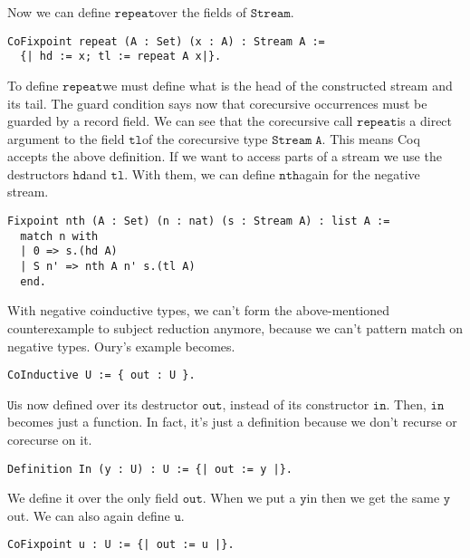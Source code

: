 \documentclass[a4paper,cleardoubleempty,BCOR1cm]{scrbook}
\begin{document}
Now we can define $\mathtt{repeat}$\;over the fields of $\mathtt{Stream}$.

\begin{verbatim}
CoFixpoint repeat (A : Set) (x : A) : Stream A :=
  {| hd := x; tl := repeat A x|}.
\end{verbatim}

To define $\mathtt{repeat}$\;we must define what is the head of the constructed stream
and its tail.  The guard condition says now that corecursive
occurrences must be guarded by a record field.  We can see that the
corecursive call $\mathtt{repeat}$\;is a direct argument to the field $\mathtt{tl}$\;of the
corecursive type $\mathtt{Stream\;A}$.  This means Coq accepts the above definition.
If we want to access parts of a stream we use the destructors $\mathtt{hd}$\;and
$\mathtt{tl}$.  With them, we can define $\mathtt{nth}$\;again for the negative stream.

\begin{verbatim}
Fixpoint nth (A : Set) (n : nat) (s : Stream A) : list A :=
  match n with
  | 0 => s.(hd A)
  | S n' => nth A n' s.(tl A)
  end.
\end{verbatim}

With negative coinductive types, we can't form the above-mentioned
counterexample to subject reduction anymore, because we can't pattern match
on negative types. Oury's example becomes.

\begin{verbatim}
CoInductive U := { out : U }.
\end{verbatim}

$\mathtt{U}$\;is now defined over its destructor $\mathtt{out}$, instead of its constructor
 $\mathtt{in}$. Then, $\mathtt{in}$\;\linebreak becomes just a function. In fact, it's just a
 definition because we don't recurse or corecurse on it.

\begin{verbatim}
Definition In (y : U) : U := {| out := y |}.
\end{verbatim}

We define it over the only field $\mathtt{out}$.  When we put a $\mathtt{y}$\;in then we get
the same $\mathtt{y}$\;out.  We can also again define $\mathtt{u}$.

\begin{verbatim}
CoFixpoint u : U := {| out := u |}.
\end{verbatim}
\end{document}
